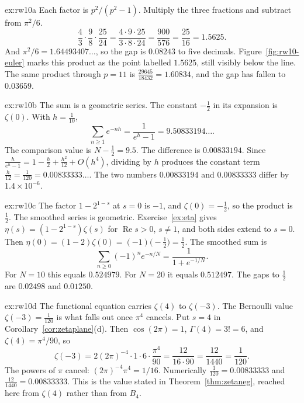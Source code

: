 \begin{solution}{ex:rw10a}
\idea Each factor is $p^2/(p^2-1)$. Multiply the three fractions and subtract from $\pi^2/6$.
\writeup 
\[
\frac43\cdot\frac98\cdot\frac{25}{24}=\frac{4\cdot9\cdot25}{3\cdot8\cdot24}=\frac{900}{576}=\frac{25}{16}=1.5625.
\]
And $\pi^2/6=1.64493407\ldots$, so the gap is $0.08243$ to five decimals. Figure~\ref{fig:rw10-euler} marks this product as the point labelled $1.5625$, still visibly below the line. The same product through $p=11$ is $\frac{29645}{18432}=1.60834$, and the gap has fallen to $0.03659$.
\end{solution}

\begin{solution}{ex:rw10b}
\idea The sum is a geometric series. The constant $-\frac12$ in its expansion is $\zeta(0)$.
\writeup With $h=\frac1{10}$,
\[
\sum_{n\ge1}e^{-nh}=\frac1{e^h-1}=9.50833194\ldots.
\]
The comparison value is $N-\frac12=9.5$. The difference is $0.00833194$. Since $\frac h{e^h-1}=1-\frac h2+\frac{h^2}{12}+O(h^4)$, dividing by $h$ produces the constant term $\frac h{12}=\frac1{120}=0.00833333\ldots$. The two numbers $0.00833194$ and $0.00833333$ differ by $1.4\times10^{-6}$.
\end{solution}

\begin{solution}{ex:rw10c}
\idea The factor $1-2^{1-s}$ at $s=0$ is $-1$, and $\zeta(0)=-\frac12$, so the product is $\frac12$. The smoothed series is geometric.
\writeup Exercise~\ref{ex:eta} gives $\eta(s)=(1-2^{1-s})\zeta(s)$ for $\operatorname{Re}s>0$, $s\ne1$, and both sides extend to $s=0$. Then $\eta(0)=(1-2)\zeta(0)=(-1)\bigl(-\frac12\bigr)=\frac12$. The smoothed sum is
\[
\sum_{n\ge0}(-1)^ne^{-n/N}=\frac1{1+e^{-1/N}}.
\]
For $N=10$ this equals $0.524979$. For $N=20$ it equals $0.512497$. The gaps to $\frac12$ are $0.02498$ and $0.01250$.
\end{solution}

\begin{solution}{ex:rw10d}
\idea The functional equation carries $\zeta(4)$ to $\zeta(-3)$. The Bernoulli value $\zeta(-3)=\frac1{120}$ is what falls out once $\pi^4$ cancels.
\writeup Put $s=4$ in Corollary~\ref{cor:zetaplane}(d). Then $\cos(2\pi)=1$, $\Gamma(4)=3!=6$, and $\zeta(4)=\pi^4/90$, so
\[
\zeta(-3)=2(2\pi)^{-4}\cdot1\cdot6\cdot\frac{\pi^4}{90}=\frac{12}{16\cdot90}=\frac{12}{1440}=\frac1{120}.
\]
The powers of $\pi$ cancel: $(2\pi)^{-4}\pi^4=1/16$. Numerically $\frac1{120}=0.00833333$ and $\frac{12}{1440}=0.00833333$. This is the value stated in Theorem~\ref{thm:zetaneg}, reached here from $\zeta(4)$ rather than from $B_4$.
\end{solution}

